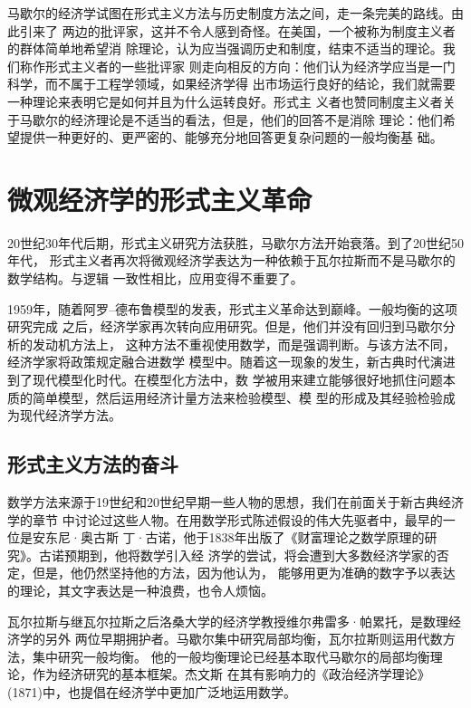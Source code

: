 马歇尔的经济学试图在形式主义方法与历史制度方法之间，走一条完美的路线。由此引来了
两边的批评家，这并不令人感到奇怪。在美国，一个被称为制度主义者的群体简单地希望消
除理论，认为应当强调历史和制度，结束不适当的理论。我们称作形式主义者的一些批评家
则走向相反的方向：他们认为经济学应当是一门科学，而不属于工程学领域，如果经济学得
出市场运行良好的结论，我们就需要一种理论来表明它是如何并且为什么运转良好。形式主
义者也赞同制度主义者关于马歇尔的经济理论是不适当的看法，但是，他们的回答不是消除
理论：他们希望提供一种更好的、更严密的、能够充分地回答更复杂问题的一般均衡基
础。


\section{微观经济学的形式主义革命}

20世纪30年代后期，形式主义研究方法获胜，马歇尔方法开始衰落。到了20世纪50年代，
形式主义者再次将微观经济学表达为一种依赖于瓦尔拉斯而不是马歇尔的数学结构。与逻辑
一致性相比，应用变得不重要了。

1959年，随着阿罗--德布鲁模型的发表，形式主义革命达到巅峰。一般均衡的这项研究完成
之后，经济学家再次转向应用研究。但是，他们并没有回归到马歇尔分析的发动机方法上，
这种方法不重视使用数学，而是强调判断。与该方法不同，经济学家将政策规定融合进数学
模型中。随着这一现象的发生，新古典时代演进到了现代模型化时代。在模型化方法中，数
学被用来建立能够很好地抓住问题本质的简单模型，然后运用经济计量方法来检验模型、模
型的形成及其经验检验成为现代经济学方法。

\subsection{形式主义方法的奋斗}

数学方法来源于19世纪和20世纪早期一些人物的思想，我们在前面关于新古典经济学的章节
中讨论过这些人物。在用数学形式陈述假设的伟大先驱者中，最早的一位是安东尼·奥古斯
丁·古诺，他于1838年出版了《财富理论之数学原理的研究》。古诺预期到，他将数学引入经
济学的尝试，将会遭到大多数经济学家的否定，但是，他仍然坚持他的方法，因为他认为，
能够用更为准确的数字予以表达的理论，其文字表达是一种浪费，也令人烦恼。

瓦尔拉斯与继瓦尔拉斯之后洛桑大学的经济学教授维尔弗雷多·帕累托，是数理经济学的另外
两位早期拥护者。马歇尔集中研究局部均衡，瓦尔拉斯则运用代数方法，集中研究一般均衡。
他的一般均衡理论已经基本取代马歇尔的局部均衡理论，作为经济研究的基本框架。杰文斯
在其有影响力的《政治经济学理论》(1871)中，也提倡在经济学中更加广泛地运用数学。

